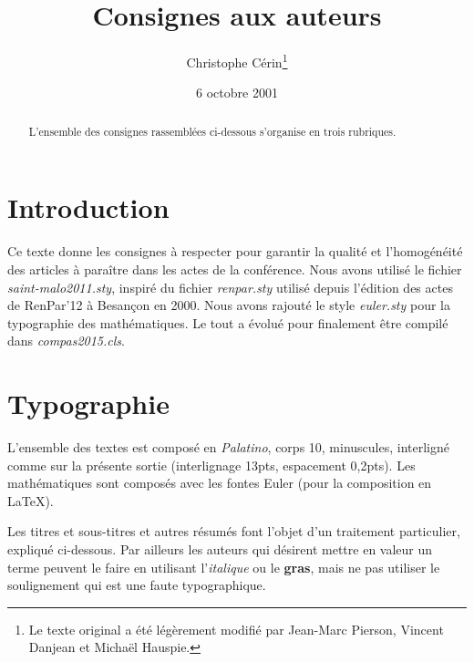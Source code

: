 \documentclass[twoside]{article}
\begin{document}
\parindent=0pt

\title{\Large\bf Consignes aux auteurs}

\author{Christophe Cérin\thanks{Le texte original a été légèrement
    modifié par Jean-Marc Pierson, Vincent Danjean et Michaël Hauspie.}}%

\date{6 octobre 2001}

\maketitle

\begin{abstract}
L'ensemble  des  consignes rassemblées ci-dessous s'organise  en trois
rubriques.
\end{abstract}

\section{Introduction}

Ce texte donne les consignes à respecter pour garantir la qualité et
l'homogénéité des articles à paraître dans les actes de la
conf\'erence. Nous avons utilisé le fichier {\em saint-malo2011.sty},
inspiré du fichier {\em renpar.sty} utilisé depuis l'édition des actes
de RenPar'12 \`a Besançon en 2000. Nous avons rajouté le style {\em
  euler.sty} pour la typographie des mathématiques. Le tout a évolué pour
finalement être compilé dans {\em compas2015.cls}.

\section{Typographie}

L'ensemble des textes est composé en {\em Palatino\/}, corps 10,
minuscules, interligné comme sur la présente sortie (interlignage
13pts, espacement 0,2pts). Les mathématiques sont composés avec les
fontes Euler (pour la composition en \LaTeX).

Les titres et sous-titres et autres résumés font l'objet d'un
traitement particulier, expliqué ci-dessous. Par ailleurs les auteurs
qui désirent mettre en valeur un terme peuvent le faire en utilisant
l'{\em italique\/} ou le {\bf gras}, mais ne pas utiliser le
soulignement qui est une faute typographique.
\end{document}
